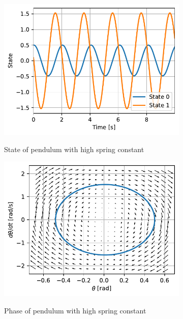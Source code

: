 \documentclass{cmc}
\begin{document}
\begin{figure}[H]
  \centering
  \begin{subfigure}[b]{0.49\textwidth}
    { \centering
      \includegraphics[width=\textwidth]{figures/State_Spring_Constant_1(x0_=_[0dot5,_0dot1]).pdf}
    }
    \caption{State of pendulum with high spring constant}
    \label{fig:state-pendulum-spring-constant-1}
  \end{subfigure}
  \begin{subfigure}[b]{0.49\textwidth}
    { \centering
      \includegraphics[width=\textwidth]{figures/Phase_Spring_Constant_1(x0_=_[0dot5,_0dot1]).pdf}
    }
    \caption{Phase of pendulum with high spring constant}
    \label{fig:phase-pendulum-spring-constant-1}
  \end{subfigure}
  \caption{}
  \label{fig:pendulum-spring-constant-1}
\end{figure}
\end{document}
